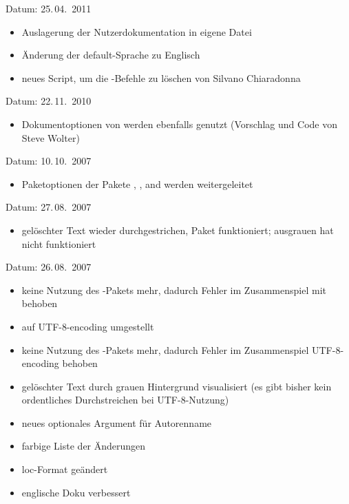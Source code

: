 
Datum: 25.\,04.~2011
\begin{itemize}
	\item Auslagerung der Nutzerdokumentation in eigene Datei
	\item Änderung der default-Sprache zu Englisch
	\item neues Script, um die -Befehle zu löschen von Silvano Chiaradonna
\end{itemize}


Datum: 22.\,11.~2010
\begin{itemize}
\item Dokumentoptionen von  werden ebenfalls genutzt (Vorschlag und Code von Steve Wolter)
\end{itemize}


Datum: 10.\,10.~2007
\begin{itemize}
	\item Paketoptionen der Pakete , , and  werden weitergeleitet
\end{itemize}


Datum: 27.\,08.~2007
\begin{itemize}
	\item gelöschter Text wieder durchgestrichen, Paket  funktioniert; ausgrauen hat nicht funktioniert
\end{itemize}


Datum: 26.\,08.~2007
\begin{itemize}
	\item keine Nutzung des -Pakets mehr, dadurch Fehler im Zusammenspiel mit  behoben
	\item auf UTF-8-encoding umgestellt
	\item keine Nutzung des -Pakets mehr, dadurch Fehler im Zusammenspiel UTF-8-encoding behoben
	\item gelöschter Text durch grauen Hintergrund visualisiert (es gibt bisher kein ordentliches Durchstreichen bei UTF-8-Nutzung)
	\item neues optionales Argument für Autorenname
	\item farbige Liste der Änderungen
	\item loc-Format geändert
	\item englische Doku verbessert
\end{itemize}

